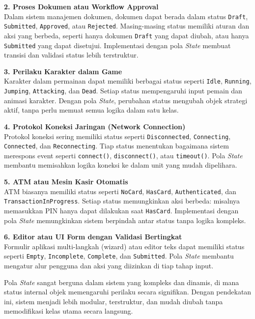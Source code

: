 \textbf{2. Proses Dokumen atau Workflow Approval} \\
Dalam sistem manajemen dokumen, dokumen dapat berada dalam status \texttt{Draft}, \texttt{Submitted}, \texttt{Approved}, atau \texttt{Rejected}. Masing-masing status memiliki aturan dan aksi yang berbeda, seperti hanya dokumen \texttt{Draft} yang dapat diubah, atau hanya \texttt{Submitted} yang dapat disetujui. Implementasi dengan pola \textit{State} membuat transisi dan validasi status lebih terstruktur.

\textbf{3. Perilaku Karakter dalam Game} \\
Karakter dalam permainan dapat memiliki berbagai status seperti \texttt{Idle}, \texttt{Running}, \texttt{Jumping}, \texttt{Attacking}, dan \texttt{Dead}. Setiap status mempengaruhi input pemain dan animasi karakter. Dengan pola \textit{State}, perubahan status mengubah objek strategi aktif, tanpa perlu memuat semua logika dalam satu kelas.

\textbf{4. Protokol Koneksi Jaringan (Network Connection)} \\
Protokol koneksi sering memiliki status seperti \texttt{Disconnected}, \texttt{Connecting}, \texttt{Connected}, dan \texttt{Reconnecting}. Tiap status menentukan bagaimana sistem merespons event seperti \texttt{connect()}, \texttt{disconnect()}, atau \texttt{timeout()}. Pola \textit{State} membantu memisahkan logika koneksi ke dalam unit yang mudah dipelihara.

\textbf{5. ATM atau Mesin Kasir Otomatis} \\
ATM biasanya memiliki status seperti \texttt{NoCard}, \texttt{HasCard}, \texttt{Authenticated}, dan \texttt{TransactionInProgress}. Setiap status memungkinkan aksi berbeda: misalnya memasukkan PIN hanya dapat dilakukan saat \texttt{HasCard}. Implementasi dengan pola \textit{State} memungkinkan sistem berpindah antar status tanpa logika kompleks.

\textbf{6. Editor atau UI Form dengan Validasi Bertingkat} \\
Formulir aplikasi multi-langkah (wizard) atau editor teks dapat memiliki status seperti \texttt{Empty}, \texttt{Incomplete}, \texttt{Complete}, dan \texttt{Submitted}. Pola \textit{State} membantu mengatur alur pengguna dan aksi yang diizinkan di tiap tahap input.

Pola \textit{State} sangat berguna dalam sistem yang kompleks dan dinamis, di mana status internal objek memengaruhi perilaku secara signifikan. Dengan pendekatan ini, sistem menjadi lebih modular, terstruktur, dan mudah diubah tanpa memodifikasi kelas utama secara langsung.


